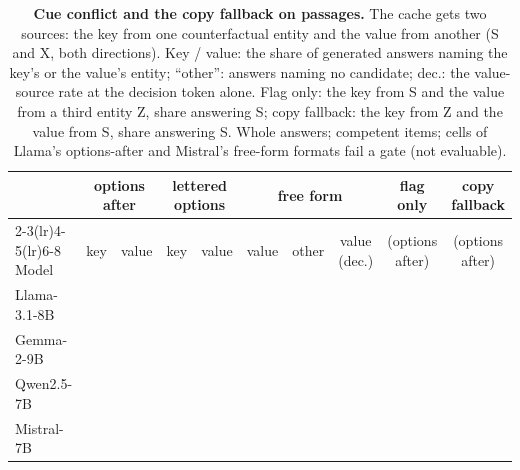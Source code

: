 \begin{table}[!ht]
\centering
\footnotesize
\caption{\textbf{Cue conflict and the copy fallback on passages.} The cache gets two sources: the key from one counterfactual entity and the value from another (S and X, both directions). Key / value: the share of generated answers naming the key's or the value's entity; ``other'': answers naming no candidate; dec.: the value-source rate at the decision token alone. Flag only: the key from S and the value from a third entity Z, share answering S; copy fallback: the key from Z and the value from S, share answering S. Whole answers; competent items; cells of Llama's options-after and Mistral's free-form formats fail a gate (not evaluable).}
\label{tab:cue}
\setlength{\tabcolsep}{4pt}
\begin{tabular}{@{}lccccccccc@{}}
\toprule
 & \multicolumn{2}{c}{options after} & \multicolumn{2}{c}{lettered options} & \multicolumn{3}{c}{free form} & flag only & copy fallback \\
\cmidrule(lr){2-3}\cmidrule(lr){4-5}\cmidrule(lr){6-8}
Model & key & value & key & value & value & other & value (dec.) & (options after) & (options after) \\
\midrule
Llama-3.1-8B & \JaKeySrcOptaLlamaEight{} & \JaValSrcOptaLlamaEight{} & \JaKeySrcLetaLlamaEight{} & \JaValSrcLetaLlamaEight{} & \JaValSrcNomLlamaEight{} & \JaOtherNomLlamaEight{} & \JaValSrcDecNomLlamaEight{} & \JaSixdOptaLlamaEight{} & \JaSixeSLlamaEight{} \\
Gemma-2-9B & \JaKeySrcOptaGemmaNine{} & \JaValSrcOptaGemmaNine{} & \JaKeySrcLetaGemmaNine{} & \JaValSrcLetaGemmaNine{} & \JaValSrcNomGemmaNine{} & \JaOtherNomGemmaNine{} & \JaValSrcDecNomGemmaNine{} & \JaSixdOptaGemmaNine{} & \JaSixeSGemmaNine{} \\
Qwen2.5-7B & \JaKeySrcOptaQwenSeven{} & \JaValSrcOptaQwenSeven{} & \JaKeySrcLetaQwenSeven{} & \JaValSrcLetaQwenSeven{} & \JaValSrcNomQwenSeven{} & \JaOtherNomQwenSeven{} & \JaValSrcDecNomQwenSeven{} & \JaSixdOptaQwenSeven{} & \JaSixeSQwenSeven{} \\
Mistral-7B & \JaKeySrcOptaMistralSeven{} & \JaValSrcOptaMistralSeven{} & \JaKeySrcLetaMistralSeven{} & \JaValSrcLetaMistralSeven{} & \JaValSrcNomMistralSeven{} & \JaOtherNomMistralSeven{} & \JaValSrcDecNomMistralSeven{} & \JaSixdOptaMistralSeven{} & \JaSixeSMistralSeven{} \\
\bottomrule
\end{tabular}
\end{table}

